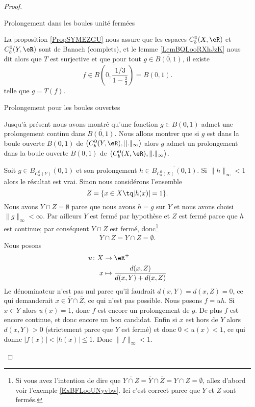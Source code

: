 \begin{proof}
\begin{subproof}
\item[Prolongement dans les boules unité fermées]

    La proposition \ref{PropSYMEZGU} nous assure que les espaces \( C^0_b(X,\eR)\) et \( C_b^0(Y,\eR)\) sont de Banach (complets), et le lemme \ref{LemBQLooRXhJzK} nous dit alors que \( T\) est surjective et que pour tout \( g\in\overline{ B(0,1) }\), il existe 
    \begin{equation}
        f\in\overline{ B\left( 0,\frac{ 1/3 }{ 1-\frac{ 2 }{ 3 } } \right) }=\overline{ B(0,1) }.
    \end{equation}
    telle que \( g=T(f)\).


\item[Prolongement pour les boules ouvertes]

    Jusqu'à présent nous avons montré qu'une fonction \( g\in\overline{ B(0,1) }\) admet une prolongement continu dans \( \overline{ B(0,1) }\). Nous allons montrer que si \( g\) est dans la boule ouverte \( B(0,1)\) de \( \big( C^0_b(Y,\eR),\| . \|_{\infty} \big)\) alors \( g\) admet un prolongement dans la boule ouverte \( B(0,1)\) de \( \big( C_b^0(X,\eR),\| . \|_{\infty} \big)\).

    Soit \( g\in B_{C^0_b(Y)}(0,1) \) et son prolongement \( h\in \overline{ B_{C_b^0(X)}(0,1) }\). Si \( \| h \|_{\infty}<1\) alors le résultat est vrai. Sinon nous considérons l'ensemble
    \begin{equation}
        Z=\{ x\in X\tq | h(x) |=1 \}.
    \end{equation}
    Nous avons \( Y\cap Z=\emptyset\) parce que nous avons \( h=g\) sur \( Y\) et nous avons choisi \( \| g \|_{\infty}<\infty\). Par ailleurs \( Y\) est fermé par hypothèse et \( Z\) est fermé parce que \( h\) est continue; par conséquent \( Y\cap Z\) est fermé, donc\footnote{Si vous avez l'intention de dire que \( \overline{ Y\cap Z }=\bar Y\cap\bar Z=Y\cap Z=\emptyset\), allez d'abord voir l'exemple \ref{ExBFLooUNyvbw}. Ici c'est correct parce que \( Y\) et \( Z\) sont fermés.}
    \begin{equation}
        \bar Y\cap\bar Z=Y\cap Z=\emptyset.
    \end{equation}
    Nous posons
    \begin{equation}
        \begin{aligned}
            u\colon X&\to \eR^+ \\
            x&\mapsto \frac{ d(x,Z) }{ d(x,Y)+d(x,Z) } 
        \end{aligned}
    \end{equation}
    Le dénominateur n'est pas nul parce qu'il faudrait \( d(x,Y)=d(x,Z)=0\), ce qui demanderait \( x\in \bar Y\cap\bar Z\), ce qui n'est pas possible. Nous posons \( f=uh\). Si \( x\in Y\) alors \( u(x)=1\), donc \( f\) est encore un prolongement de \( g\). De plus \( f\) est encore continue, et donc encore un bon candidat. Enfin si \( x\) est hors de \( Y\) alors \( d(x,Y)>0\) (strictement parce que \( Y\) est fermé) et donc \( 0<u(x)<1\), ce qui donne \( | f(x) |<| h(x) |\leq 1\). Donc \( \| f \|_{\infty}<1\).


\end{subproof}
\end{proof}
